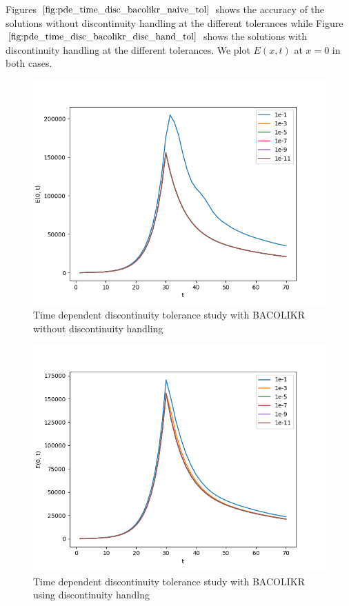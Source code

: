 \documentclass{article}
\begin{document}
Figures $\ref{fig:pde_time_disc_bacolikr_naive_tol}$ shows the accuracy of the solutions without discontinuity handling at the different tolerances while Figure $\ref{fig:pde_time_disc_bacolikr_disc_hand_tol}$ shows the solutions with discontinuity handling at the different tolerances. We plot $E(x, t)$ at $x=0$ in both cases. 

\begin{figure}[H]
\centering
\includegraphics[width=0.7\linewidth]{./figures/pde_time_disc_bacolikr_naive_tol}
\caption{Time dependent discontinuity tolerance study with BACOLIKR without discontinuity handling}
\label{fig:pde_time_disc_bacolikr_naive_tol}
\end{figure}

\begin{figure}[H]
\centering
\includegraphics[width=0.7\linewidth]{./figures/pde_time_disc_bacolikr_disc_hand_tol}
\caption{Time dependent discontinuity tolerance study with BACOLIKR using discontinuity handlng}
\label{fig:pde_time_disc_bacolikr_disc_hand_tol}
\end{figure}
\end{document}
